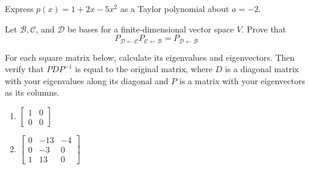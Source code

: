 \documentclass[12pt,letterpaper]{hmcpset}
\newcommand{\m}[1]{\begin{bmatrix} #1 \end{bmatrix}}
\begin{document}
\begin{problem}[6.3.18]
    Express $p(x)=1+2x-5x^2$ as a Taylor polynomial about $a=-2$.
\end{problem}
\begin{solution}
    \vfill
\end{solution}
\newpage

\begin{problem}[6.3.21]
    Let $\mathcal{B},\mathcal{C}$, and $\mathcal{D}$ be bases for a
    finite-dimensional vector space $V$. Prove that
    $$P_{\mathcal{D}\leftarrow\mathcal{C}}P_{\mathcal{C}\leftarrow\mathcal{B}}
    =P_{\mathcal{D}\leftarrow\mathcal{B}}$$
\end{problem}
\begin{solution}
    \vfill
\end{solution}
\newpage

\begin{problem}
    For each square matrix below, calculate its eigenvalues and eigenvectors.
    Then verify that $PDP^{-1}$ is equal to the original matrix, where $D$ is a
    diagonal matrix with your eigenvalues along its diagonal and $P$ is a matrix
    with your eigenvectors as its columns.
    \begin{enumerate}
        \item $\m{1&0\\0&0}$
        \item $\m{0&-13&-4\\0&-3&0\\1&13&0}$
    \end{enumerate}
\end{problem}
\begin{solution}
    \vfill
\end{solution}
\end{document}

